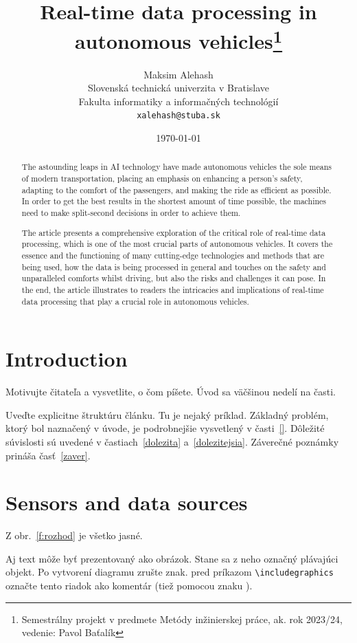 \documentclass[10pt,oneside,english,a4paper]{article}
\title{Real-time data processing in autonomous vehicles\thanks{Semestrálny projekt v predmete Metódy inžinierskej práce, ak. rok 2023/24, vedenie: Pavol Baťalík}} %
\author{Maksim Alehash\\[2pt]
	{\small Slovenská technická univerzita v Bratislave}\\
	{\small Fakulta informatiky a informačných technológií}\\
	{\small \texttt{xalehash@stuba.sk}}
	}
\date{\small\today} %
\begin{document}
\maketitle

\begin{abstract}
The astounding leaps in AI technology have made autonomous vehicles the sole means of modern transportation, placing an emphasis on enhancing a person's safety, adapting to the comfort of the passengers, and making the ride as efficient as possible. In order to get the best results in the shortest amount of time possible, the machines need to make split-second decisions in order to achieve them. 
\par The article presents a comprehensive exploration of the critical role of real-time data processing, which is one of the most crucial parts of autonomous vehicles. It covers the essence and the functioning of many cutting-edge technologies and methods that are being used, how the data is being processed in general and touches on the safety and unparalleled comforts whilst driving, but also the risks and challenges it can pose. In the end, the article illustrates to readers the intricacies and implications of real-time data processing that play a crucial role in autonomous vehicles.
\end{abstract}


\tableofcontents\pagebreak 


\section{Introduction} \label{introduction}

Motivujte čitateľa a vysvetlite, o čom píšete. Úvod sa väčšinou nedelí na časti.

Uveďte explicitne štruktúru článku. Tu je nejaký príklad.
Základný problém, ktorý bol naznačený v úvode, je podrobnejšie vysvetlený v časti~\ref{}.
Dôležité súvislosti sú uvedené v častiach~\ref{dolezita} a~\ref{dolezitejsia}.
Záverečné poznámky prináša časť~\ref{zaver}.



\section{Sensors and data sources} \label{sensors and data sources}

Z obr.~\ref{f:rozhod} je všetko jasné. 


Aj text môže byť prezentovaný ako obrázok. Stane sa z neho označný plávajúci objekt. Po vytvorení diagramu zrušte znak. pred príkazom \verb|\includegraphics| označte tento riadok ako komentár (tiež pomocou znaku ).
\end{document}
